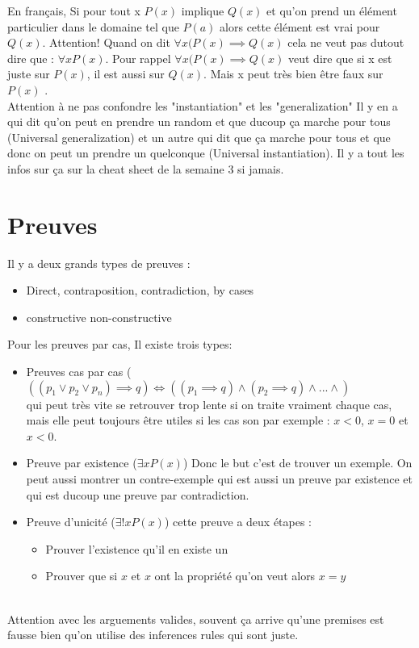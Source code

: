 En français, Si pour tout x $P(x)$ implique $Q(x)$ et qu'on prend un élément particulier dans le domaine tel que $P(a)$ alors cette élément est vrai pour $Q(x)$.
Attention! Quand on dit $\forall x (P(x) \implies Q(x)$ cela ne veut pas dutout dire que : $\forall x P(x)$. Pour rappel $\forall x (P(x) \implies Q(x)$ veut dire que si x est juste sur $P(x)$, il est aussi sur $Q(x)$. Mais x peut très bien être faux sur $P(x)$ .
\\
Attention à ne pas confondre les "instantiation" et les "generalization" Il y en a qui dit qu'on peut en prendre un random et que ducoup ça marche pour tous (Universal generalization) et un autre qui dit que ça marche pour tous et que donc on peut un prendre un quelconque (Universal instantiation). Il y a tout les infos sur ça sur la cheat sheet de la semaine 3 si jamais.

\section{Preuves}
Il y a deux grands types de preuves : 
\begin{itemize}
    \item Direct, contraposition, contradiction, by cases
    \item constructive non-constructive
\end{itemize}

Pour les preuves par cas, Il existe trois types:
\begin{itemize}
    \item Preuves cas par cas ($((p_1 \vee p_2 \vee p_n) \implies q) \iff ((p_1 \implies q) \wedge (p_2 \implies q) \wedge ... \wedge)$ \\
    qui peut très vite se retrouver trop lente si on traite vraiment chaque cas, mais elle peut toujours être utiles si les cas son par exemple : $x < 0$, $x = 0$ et $x < 0$.
    \item Preuve par existence ($\exists xP(x)$) Donc le but c'est de trouver un exemple. On peut aussi montrer un contre-exemple qui est aussi un preuve par existence et qui est ducoup une preuve par contradiction.
    \item Preuve d'unicité ($\exists !xP(x)$) cette preuve a deux étapes : 
    \begin{itemize}
        \item Prouver l'existence qu'il en existe un
        \item Prouver que si $x$ et $x$ ont la propriété qu'on veut alors $x = y$
    \end{itemize}
\end{itemize}
\\
Attention avec les arguements valides, souvent ça arrive qu'une premises est fausse bien qu'on utilise des inferences rules qui sont juste.

